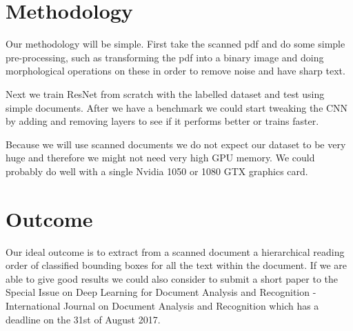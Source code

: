 \documentclass[10pt,twocolumn,letterpaper]{article}
\begin{document}
\section{Methodology}
Our methodology will be simple. First take the scanned pdf and do some simple pre-processing, such as transforming the pdf into a binary image and doing morphological operations on these in order to remove noise and have sharp text.

Next we train ResNet from scratch with the labelled dataset and test using simple documents. After we have a benchmark we could start tweaking the CNN by adding and removing layers to see if it performs better or trains faster.

Because we will use scanned documents we do not expect our dataset to be very huge and therefore we might not need very high GPU memory. We could probably do well with a single Nvidia 1050 or 1080 GTX graphics card. 

\section{Outcome}
Our ideal outcome is to extract from a scanned document a hierarchical reading order of classified bounding boxes for all the text within the document. If we are able to give good results we could also consider to submit a short paper to the Special Issue on Deep Learning for Document Analysis and Recognition - International Journal on Document Analysis and Recognition which has a deadline on the 31st of August 2017.
{\small


}
\end{document}

